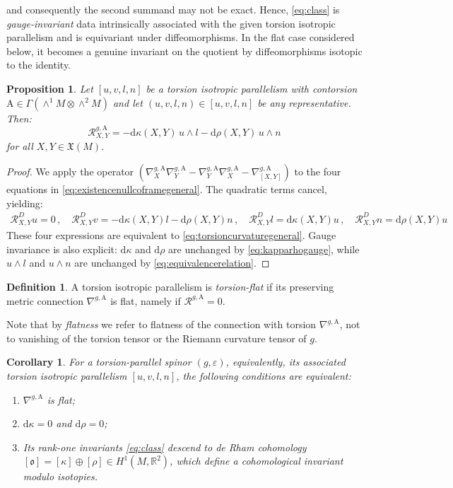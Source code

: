 \documentclass[10pt,reqno,a4paper]{amsart}
\theoremstyle{plain}
\newtheorem{prop}[thm]{Proposition}
\newtheorem{cor}[thm]{Corollary}
\theoremstyle{definition}
\newtheorem{definition}[thm]{Definition}
\theoremstyle{remark}
\theoremstyle{remark}
\def\mA{\mathrm{A}}
\def\dd{\mathrm{d}}
\def\cR{{\mathcal R}}
\renewcommand{\(}{ (}
\renewcommand{\)}{ )}
\begin{document}
\noindent
and consequently the second summand may not be exact. Hence, \eqref{eq:class} is \emph{gauge-invariant} data intrinsically associated with the given torsion isotropic parallelism and is equivariant under diffeomorphisms. In the flat case considered below, it becomes a genuine invariant on the quotient by diffeomorphisms isotopic to the identity.
 

\begin{prop}
\label{prop:curvaturetorsion}
Let $[u,v,l,n]$ be a torsion isotropic parallelism with contorsion $\mA\in \Gamma(\wedge^1 M \otimes \wedge^2 M)$ and let $(u,v,l,n)\in [u,v,l,n]$ be any representative.  Then:
\begin{equation}
\label{eq:torsioncurvaturegeneral}
\cR^{g,\mA}_{X,Y} =-\dd\kappa(X,Y)\,u\wedge l - \dd\rho(X,Y)\,u\wedge n
\end{equation}
for all $X,Y\in\mathfrak X(M)$.
\end{prop}

\begin{proof}
We apply the operator $(\nabla^{g,\mA}_X \nabla^{g,\mA}_Y - \nabla^{g,\mA}_Y \nabla^{g,\mA}_X - \nabla^{g,\mA}_{[X,Y]})$ to the four equations in \eqref{eq:existencenullcoframegeneral}.  The quadratic terms cancel, yielding:
\begin{eqnarray*}
\cR^D_{X,Y}u =0\, , \quad \cR^D_{X,Y}v =-\dd\kappa(X,Y)l-\dd\rho(X,Y)n\, , \quad \cR^D_{X,Y}l = \dd\kappa(X,Y)u\, , \quad \cR^D_{X,Y}n = \dd\rho(X,Y)u\, 
\end{eqnarray*}
These four expressions are equivalent to \eqref{eq:torsioncurvaturegeneral}.  Gauge invariance is also explicit:
$\dd\kappa$ and $\dd\rho$ are unchanged by \eqref{eq:kapparhogauge}, while $u\wedge l$ and $u\wedge n$ are unchanged
by \eqref{eq:equivalencerelation}.
\end{proof} 

\begin{definition}
\label{def:torsion-flat}
A torsion isotropic parallelism is \emph{torsion-flat} if its preserving metric connection $\nabla^{g,\mA}$ is flat, namely if $\cR^{g,\mA} = 0$.
\end{definition}

\noindent
Note that by \emph{flatness} we refer to flatness of the connection with torsion $\nabla^{g ,\mA}$, not to vanishing of the torsion tensor or the Riemann curvature tensor of $g$.

\begin{cor}
\label{cor:torsionflat}
For a torsion-parallel spinor $(g,\varepsilon)$, equivalently, its associated torsion isotropic parallelism $[u,v,l,n]$, the following conditions are equivalent:
\begin{enumerate}
\item $\nabla^{g,\mA}$ is flat;
\item $\dd\kappa=0$ and $\dd\rho=0$;
\item Its rank-one invariants \eqref{eq:class} descend to de Rham cohomology $[\mathfrak{o}] = [\kappa] \oplus [\rho] \in H^1 (M,\mathbb R^2)$, which define a cohomological invariant modulo isotopies.
\end{enumerate}
\end{cor}
\end{document}
